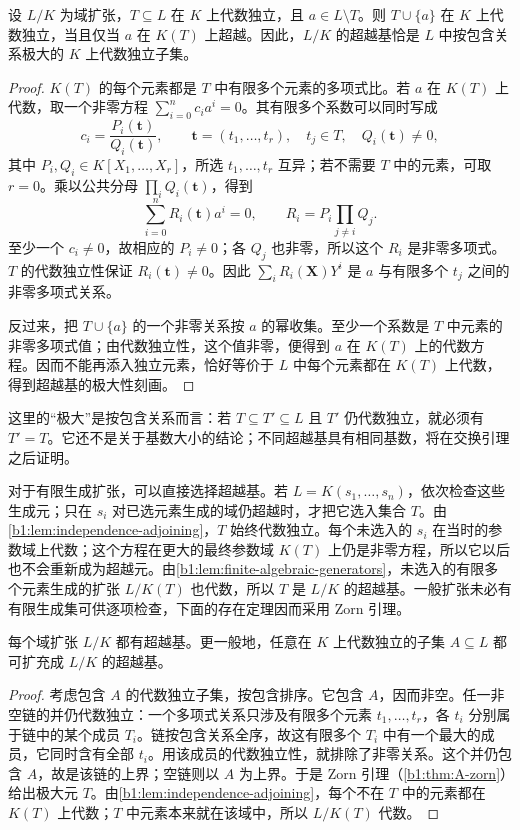 \begin{lemma}\label{b1:lem:independence-adjoining}
	设 \(L/K\) 为域扩张，\(T\subseteq L\) 在 \(K\) 上代数独立，且 \(a\in L\setminus T\)。则 \(T\cup\{a\}\) 在 \(K\) 上代数独立，当且仅当 \(a\) 在 \(K(T)\) 上超越。因此，\(L/K\) 的超越基恰是 \(L\) 中按包含关系极大的 \(K\) 上代数独立子集。
\end{lemma}
\begin{proof}
	\(K(T)\) 的每个元素都是 \(T\) 中有限多个元素的多项式比。若 \(a\) 在 \(K(T)\) 上代数，取一个非零方程 \(\sum_{i=0}^n c_i a^i=0\)。其有限多个系数可以同时写成
	\[
		c_i=\frac{P_i(\mathbf t)}{Q_i(\mathbf t)}, \qquad \mathbf t=(t_1,\ldots,t_r),\quad t_j\in T, \quad Q_i(\mathbf t)\ne0,
	\]
	其中 \(P_i,Q_i\in K[X_1,\ldots,X_r]\)，所选 \(t_1,\ldots,t_r\) 互异；若不需要 \(T\) 中的元素，可取 \(r=0\)。乘以公共分母 \(\prod_i Q_i(\mathbf t)\)，得到
	\[
		\sum_{i=0}^n R_i(\mathbf t)a^i=0, \qquad R_i=P_i\prod_{j\ne i}Q_j.
	\]
	至少一个 \(c_i\ne0\)，故相应的 \(P_i\ne0\)；各 \(Q_j\) 也非零，所以这个 \(R_i\) 是非零多项式。\(T\) 的代数独立性保证 \(R_i(\mathbf t)\ne0\)。因此 \(\sum_i R_i(\mathbf X)Y^i\) 是 \(a\) 与有限多个 \(t_j\) 之间的非零多项式关系。

	反过来，把 \(T\cup\{a\}\) 的一个非零关系按 \(a\) 的幂收集。至少一个系数是 \(T\) 中元素的非零多项式值；由代数独立性，这个值非零，便得到 \(a\) 在 \(K(T)\) 上的代数方程。因而不能再添入独立元素，恰好等价于 \(L\) 中每个元素都在 \(K(T)\) 上代数，得到超越基的极大性刻画。
\end{proof}

这里的“极大”是按包含关系而言：若 \(T\subseteq T'\subseteq L\) 且 \(T'\) 仍代数独立，就必须有 \(T'=T\)。它还不是关于基数大小的结论；不同超越基具有相同基数，将在交换引理之后证明。

\ProseParagraphBreak
对于有限生成扩张，可以直接选择超越基。若 \(L=K(s_1,\ldots,s_n)\)，依次检查这些生成元；只在 \(s_i\) 对已选元素生成的域仍超越时，才把它选入集合 \(T\)。由\cref{b1:lem:independence-adjoining}，\(T\) 始终代数独立。每个未选入的 \(s_i\) 在当时的参数域上代数；这个方程在更大的最终参数域 \(K(T)\) 上仍是非零方程，所以它以后也不会重新成为超越元。由\cref{b1:lem:finite-algebraic-generators}，未选入的有限多个元素生成的扩张 \(L/K(T)\) 也代数，所以 \(T\) 是 \(L/K\) 的超越基。一般扩张未必有有限生成集可供逐项检查，下面的存在定理因而采用 Zorn 引理。

\begin{theorem}\label{b1:thm:transcendence-basis}
	每个域扩张 \(L/K\) 都有超越基。更一般地，任意在 \(K\) 上代数独立的子集 \(A\subseteq L\) 都可扩充成 \(L/K\) 的超越基。
\end{theorem}
\begin{proof}
	考虑包含 \(A\) 的代数独立子集，按包含排序。它包含 \(A\)，因而非空。任一非空链的并仍代数独立：一个多项式关系只涉及有限多个元素 \(t_1,\ldots,t_r\)，各 \(t_i\) 分别属于链中的某个成员 \(T_i\)。链按包含关系全序，故这有限多个 \(T_i\) 中有一个最大的成员，它同时含有全部 \(t_i\)。用该成员的代数独立性，就排除了非零关系。这个并仍包含 \(A\)，故是该链的上界；空链则以 \(A\) 为上界。于是 Zorn 引理（\cref{b1:thm:A-zorn}）给出极大元 \(T\)。由\cref{b1:lem:independence-adjoining}，每个不在 \(T\) 中的元素都在 \(K(T)\) 上代数；\(T\) 中元素本来就在该域中，所以 \(L/K(T)\) 代数。
\end{proof}

